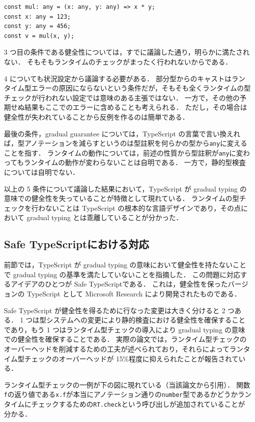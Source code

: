 \begin{lstlisting}
const mul: any = (x: any, y: any) => x * y;
const x: any = 123;
const y: any = 456;
const v = mul(x, y);
\end{lstlisting}

3 つ目の条件である健全性については，すでに議論した通り，明らかに満たされない．
そもそもランタイムのチェックがまったく行われないからである．

4 についても状況設定から議論する必要がある．
部分型からのキャストはランタイム型エラーの原因にならないという条件だが，そもそも全くランタイムの型チェックが行われない設定では意味のある主張ではない．
一方で，その他の予期せぬ結果もここでのエラーに含めることも考えられる．
ただし，その場合は健全性が失われていることから反例を作るのは簡単である．

最後の条件，gradual guarantee については，TypeScript の言葉で言い換えれば，型アノテーションを減らすというのは型註釈を何らかの型から\texttt{any}に変えることを指す．
ランタイムの動作については，前述の性質から型註釈が\texttt{any}に変わってもランタイムの動作が変わらないことは自明である．
一方で，静的型検査については自明でない．

以上の 5 条件について議論した結果において，TypeScript が gradual typing の意味での健全性を失っていることが特徴として現れている．
ランタイムの型チェックを行わないことは TypeScript の根本的な言語デザインであり，その点において gradual typing とは乖離していることが分かった．

\subsection{Safe TypeScriptにおける対応}

前節では，TypeScript が gradual typing の意味において健全性を持たないことで gradual typing の基準を満たしていないことを指摘した．
この問題に対応するアイデアのひとつが Safe TypeScript\cite{rastogi2015safe}である．
これは，健全性を保ったバージョンの TypeScript として Microsoft Research により開発されたものである．

Safe TypeScript が健全性を得るために行なった変更は大きく分けると 2 つある．
1 つは型システムへの変更により静的検査における健全性を確保することであり，もう 1 つはランタイム型チェックの導入により gradual typing の意味での健全性を確保することである．
実際の論文では，ランタイム型チェックのオーバーヘッドを削減するための工夫が述べられており，それらによってランタイム型チェックのオーバーヘッドが 15\%程度に抑えられたことが報告されている．

ランタイム型チェックの一例が下の図に現れている（当該論文\cite{rastogi2015safe}から引用）．
関数\texttt{f}の返り値である\texttt{x.f}が本当にアノテーション通りの\texttt{number}型であるかどうかランタイムにチェックするための\texttt{RT.check}という呼び出しが追加されていることが分かる．

